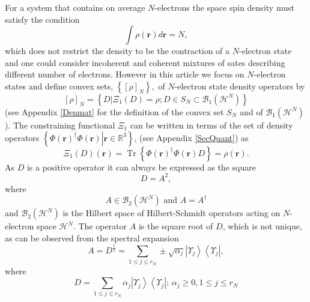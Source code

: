 \documentclass[aps,preprint]{revtex4}%
\begin{document}
For a system that contains on average $N$-electrons the space spin density
must satisfy the condition
\begin{equation}
\int\rho\left(  \boldsymbol{r}\right)  d\boldsymbol{r}=N, \label{Number}%
\end{equation}
which does not restrict the density to be the contraction of a $N$-electron
state and one could consider incoherent and coherent mixtures of sates
describing different number of electrons. However in this article we focus on
$N$-electron states and define convex sets, $\left\{  \left[  \rho\right]
_{N}\right\}  ,$ of $N$-electron state density operators by
\begin{equation}
\left[  \rho\right]  _{N}=\left\{  \left.  D\right\vert \Xi_{1}\left(
D\right)  =\rho;D\in S_{N}\subset\mathcal{B}_{1}\left(  \mathcal{H}%
^{N}\right)  \right\}
\end{equation}
(see Appendix \ref{Denmat} for the definition of the convex set $S_{N}$ and of
$\mathcal{B}_{1}\left(  \mathcal{H}^{N}\right)  $). The constraining
functional $\Xi_{1}$ can be written in terms of the set of density operators
$\left\{  \left.  \Phi\left(  \boldsymbol{r}\right)  ^{\dagger}\Phi\left(
\boldsymbol{r}\right)  \right\vert \boldsymbol{r\in}\mathbb{R}^{3}\right\}  $,
(see Appendix \ref{SecQuant}) as
\begin{equation}
\Xi_{1}\left(  D\right)  \left(  \boldsymbol{r}\right)  =\operatorname{Tr}%
\left\{  \Phi\left(  \boldsymbol{r}\right)  ^{\dagger}\Phi\left(
\boldsymbol{r}\right)  D\right\}  =\rho\left(  \boldsymbol{r}\right)  .
\end{equation}
As $D$ is a positive operator it can always be expressed as the square
\begin{equation}
D=A^{2},
\end{equation}
where
\begin{equation}
A\in\mathcal{B}_{2}\left(  \mathcal{H}^{N}\right)  \text{ and }A=A^{\dagger}%
\end{equation}
and $\mathcal{B}_{2}\left(  \mathcal{H}^{N}\right)  $ is the Hilbert space of
Hilbert-Schmidt operators acting on $N$-electron space $\mathcal{H}^{N}$. The
operator $A$ is the square root of $D$, which is not unique, as can be
observed from the spectral expansion
\begin{equation}
A=D^{\frac{1}{2}}=\sum_{1\leq j\leq r_{N}}\pm\sqrt{\alpha_{j}}\left\vert
\Upsilon_{j}\right\rangle \left\langle \Upsilon_{j}\right\vert , \label{specA}%
\end{equation}
where
\begin{equation}
D=\sum_{1\leq j\leq r_{N}}\alpha_{j}\left\vert \Upsilon_{j}\right\rangle
\left\langle \Upsilon_{j}\right\vert ;\,\alpha_{j}\geq0,1\leq j\leq r_{N}%
\end{equation}
\end{document}
